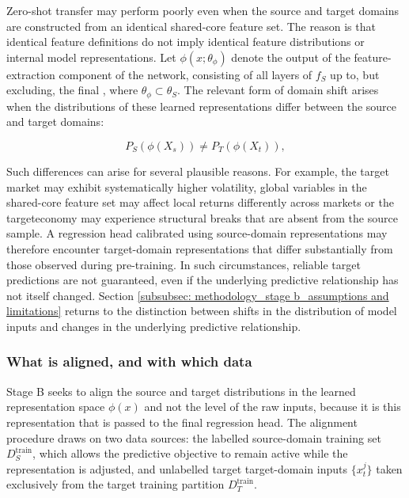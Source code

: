 Zero-shot transfer may perform poorly even when the source and target domains are constructed from an identical shared-core feature set. The reason is that identical feature definitions do not imply identical feature distributions or internal model representations. Let $\phi(x;\theta_\phi)$ denote the output of the feature-extraction component of the network, consisting of all layers of $f_S$ up to, but excluding, the final , where $\theta_\phi \subset \theta_S$. The relevant form of domain shift arises when the distributions of these learned representations differ between the source and target domains:


\begin{equation}
P_S\left(\phi\left(X_s\right)\right) \neq P_T\left(\phi\left(X_t\right)\right),
\end{equation}

\noindent Such differences can arise for several plausible reasons. For example, the target market may exhibit systematically higher volatility, global variables in the shared-core feature set may affect local returns differently across markets or the targeteconomy may experience structural breaks that are absent from the source sample. A regression head calibrated using source-domain representations may therefore encounter target-domain representations that differ substantially from those observed during pre-training. In such circumstances, reliable target predictions are not guaranteed, even if the underlying predictive relationship has not itself changed. Section \ref{subsubsec: methodology_stage b_assumptions and limitations} returns to the distinction between shifts in the distribution of model inputs and changes in the underlying predictive relationship.

\subsubsection{What is aligned, and with which data}
Stage B seeks to align the source and target distributions in the learned representation space $\phi(x)$ and not the level of the raw inputs, because it is this representation that is passed to the final regression head. The alignment procedure draws on two data sources: the labelled source-domain training set $D_S^\text{train}$, which allows the predictive objective to remain active while the representation is adjusted, and unlabelled target target-domain inputs $\{x_t^j\}$ taken exclusively from the target training partition $D_T^\text{train}$.

